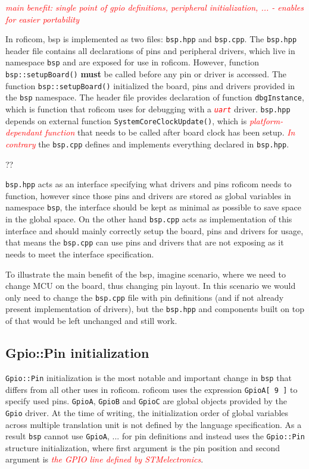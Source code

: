 \documentclass[
  digital,     %
  oneside,     %
  nosansbold,  %
  nocolorbold, %
  lof,         %
  lot,         %
]{fithesis4}
\newcommand{\TODO}[1]{\textcolor{red}{\textit{#1}}}
\begin{document}
\TODO{main benefit: single point of gpio definitions, peripheral initialization, ... - enables for easier portability}

In \acrshort{roficom}, \acrshort{bsp} is implemented as two files: \verb|bsp.hpp| and \verb|bsp.cpp|. The \verb|bsp.hpp| header file contains all declarations of pins and peripheral drivers, which live in namespace \lstinline{bsp} and are exposed for use in \acrshort{roficom}. However, function \lstinline{bsp::setupBoard()} \textbf{must} be called before any pin or driver is accessed. The function \lstinline{bsp::setupBoard()} initialized the board, pins and drivers provided in the \lstinline{bsp} namespace. The header file provides declaration of function \lstinline{dbgInstance}, which is function that \acrshort{roficom} uses for debugging with a \TODO{ \texttt{uart} } driver. \verb|bsp.hpp| depends on external function \lstinline{SystemCoreClockUpdate()}, which is \TODO{platform-dependant function} that needs to be called after board clock has been setup. \TODO{In contrary} the \verb|bsp.cpp| defines and implements everything declared in \verb|bsp.hpp|. 

??

\verb|bsp.hpp| acts as an interface specifying what drivers and pins \acrshort{roficom} needs to function, however since those pins and drivers are stored as global variables in namespace \lstinline{bsp}, the interface should be kept as minimal as possible to save space in the global space. On the other hand \verb|bsp.cpp| acts as implementation of this interface and should mainly correctly setup the board, pins and drivers for usage, that means the \verb|bsp.cpp| can use pins and drivers that are not exposing as it needs to meet the interface specification.

To illustrate the main benefit of the \acrshort{bsp}, imagine scenario, where we need to change MCU on the board, thus changing pin layout. In this scenario we would only need to change the \verb|bsp.cpp| file with pin definitions (and if not already present implementation of drivers), but the \verb|bsp.hpp| and components built on top of that would be left unchanged and still work.

\subsection{Gpio::Pin initialization}
\lstinline{Gpio::Pin} initialization is the most notable and important change in \lstinline{bsp} that differs from all other uses in \acrshort{roficom}. \acrshort{roficom} uses the expression \lstinline{GpioA[ 9 ]} to specify used pins. \lstinline{GpioA}, \lstinline{GpioB} and \lstinline{GpioC} are global objects provided by the \lstinline{Gpio} driver. At the time of writing, the initialization order of global variables across multiple translation unit is not defined by the language specification. As a result \lstinline{bsp} cannot use \lstinline{GpioA}, ... for pin definitions and instead uses the \lstinline{Gpio::Pin} structure initialization, where first argument is the pin position and second argument is \TODO{the GPIO line defined by STMelectronics}.
\end{document}
